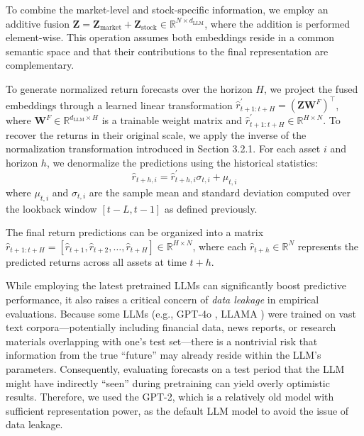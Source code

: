 To combine the market-level and stock-specific information, we employ an additive fusion $\mathbf{Z} = \mathbf{Z}_{\text{market}} + \mathbf{Z}_{\text{stock}} \in \mathbb{R}^{N \times d_{\text{LLM}}}$, where the addition is performed element-wise. This operation assumes both embeddings reside in a common semantic space and that their contributions to the final representation are complementary.

To generate normalized return forecasts over the horizon $H$, we project the fused embeddings through a learned linear transformation $\hat{r}^{\prime}_{t+1:t+H} = (\mathbf{Z} \mathbf{W}^{F})^{\top}$, where $\mathbf{W}^{F} \in \mathbb{R}^{d_{\text{LLM}} \times H}$ is a trainable weight matrix and $\hat{r}^{\prime}_{t+1:t+H} \in \mathbb{R}^{H \times N}$. To recover the returns in their original scale, we apply the inverse of the normalization transformation introduced in Section 3.2.1. For each asset $i$ and horizon $h$, we denormalize the predictions using the historical statistics:
\begin{equation}
\hat{r}_{t+h,i} = \hat{r}^{\prime}_{t+h,i} \sigma_{t,i} + \mu_{t,i}
\end{equation}
where $\mu_{t,i}$ and $\sigma_{t,i}$ are the sample mean and standard deviation computed over the lookback window $[t-L, t-1]$ as defined previously.

The final return predictions can be organized into a matrix $\hat{r}_{t+1:t+H} = [\hat{r}_{t+1}, \hat{r}_{t+2}, \ldots, \hat{r}_{t+H}] \in \mathbb{R}^{H \times N}$, where each $\hat{r}_{t+h} \in \mathbb{R}^{N}$ represents the predicted returns across all assets at time $t+h$. 

While employing the latest pretrained LLMs can significantly boost predictive performance, it also raises a critical concern of \emph{data leakage} in empirical evaluations. Because some LLMs (e.g., GPT-4o \citep{achiam2023gpt}, LLAMA \citep{dubey2024llama}) were trained on vast text corpora---potentially including financial data, news reports, or research materials overlapping with one’s test set---there is a nontrivial risk that information from the true “future” may already reside within the LLM’s parameters. Consequently, evaluating forecasts on a test period that the LLM might have indirectly “seen” during pretraining can yield overly optimistic results. Therefore, we used the GPT-2, which is a relatively old model with sufficient representation power, as the default LLM model to avoid the issue of data leakage. 


